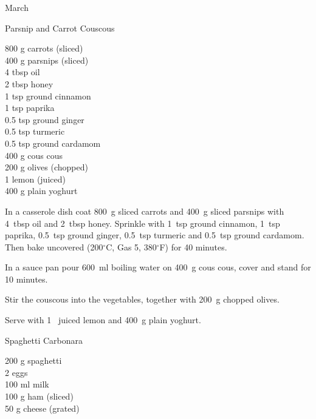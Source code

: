 \begin{menu}{March}
    \begin{recipe}{2}{Parsnip and Carrot Couscous}%
		\begin{ingredients}
		800 g carrots (sliced) \\
	400 g parsnips (sliced) \\
	4 tbsp oil  \\
	2 tbsp honey  \\
	1 tsp ground cinnamon  \\
	1 tsp paprika  \\
	0.5 tsp ground ginger  \\
	0.5 tsp turmeric  \\
	0.5 tsp ground cardamom  \\
	400 g cous cous  \\
	200 g olives (chopped) \\
	1  lemon (juiced) \\
	400 g plain yoghurt  \\
	
		\end{ingredients}
	
    \begin{instructions}
    \item 
        In a casserole dish coat
        800~g sliced carrots
        and
        400~g sliced parsnips
        with
        4~tbsp  oil
        and
        2~tbsp  honey.
        Sprinkle with
        1~tsp  ground cinnamon,
        1~tsp  paprika,
        0.5~tsp  ground ginger,
        0.5~tsp  turmeric
        and
        0.5~tsp  ground cardamom.        
        Then bake uncovered
        (200$^{\circ}$C, Gas 5, 380$^{\circ}$F)
        for 40 minutes.        
      \item 
      In a
      sauce pan pour 600~ml  boiling water
      on 400~g  cous cous, cover and
      stand for 10 minutes.
    \item 
        Stir the couscous into the vegetables,
        together with
        200~g chopped olives.
      \item 
        Serve with 1~ juiced lemon
        and
        400~g  plain yoghurt.
      
    \end{instructions}
    \end{recipe}%
  
    \begin{recipe}{1}{Spaghetti Carbonara}%
		\begin{ingredients}
		200 g spaghetti  \\
	2  eggs  \\
	100 ml milk  \\
	100 g ham (sliced) \\
	50 g cheese (grated) \\
	

\end{ingredients}
\end{recipe}
\end{menu}
